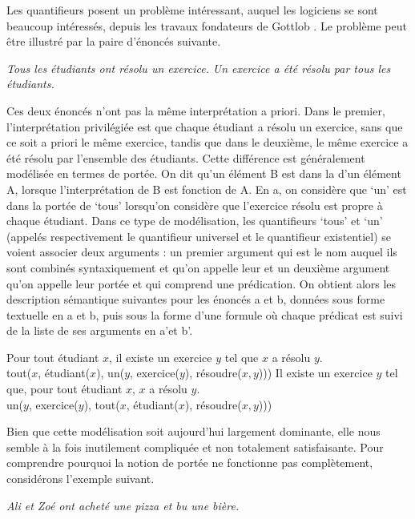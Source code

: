 {Les quantifieurs posent un problème intéressant, auquel les logiciens se sont beaucoup intéressés, depuis les travaux fondateurs de Gottlob \citet{frege1892uber}. Le problème peut être illustré par la paire d’énoncés suivante.

\ea\label{ex:13-portée}
\ea \textit{Tous les étudiants ont résolu un exercice.}
\ex \textit{Un exercice a été résolu par tous les étudiants.}\z\z

Ces deux énoncés n’ont pas la même interprétation a priori. Dans le premier, l’interprétation privilégiée est que chaque étudiant a résolu un exercice, sans que ce soit a priori le même exercice, tandis que dans le deuxième, le même exercice a été résolu par l’ensemble des étudiants. Cette différence est généralement modélisée en termes de portée. On dit qu’un élément B est dans la  d’un élément A, lorsque l’interprétation de B est fonction de A. En a, on considère que ‘un’ est dans la portée de ‘tous’ lorsqu’on considère que l’exercice résolu est propre à chaque étudiant. Dans ce type de modélisation, les quantifieurs ‘tous’ et ‘un’ (appelés respectivement le quantifieur universel et le quantifieur existentiel) se voient associer deux arguments : un premier argument qui est le nom auquel ils sont combinés syntaxiquement et qu’on appelle leur  et un deuxième argument qu’on appelle leur portée et qui comprend une prédication. On obtient alors les description sémantique suivantes pour les énoncés a et b, données sous forme textuelle en a et b, puis sous la forme d’une formule où chaque prédicat est suivi de la liste de ses arguments en a’et b’.

\ea\label{ex:13-scope}
\ea Pour tout étudiant $x$, il existe un exercice $y$ tel que $x$ a résolu $y$.\\
 tout($x$, étudiant($x$), un($y$, exercice($y$), résoudre($x,y$)))
\ex Il existe un exercice $y$ tel que, pour tout étudiant $x$, $x$ a résolu $y$.\\
un($y$, exercice($y$), tout($x$, étudiant($x$), résoudre($x,y$)))\z\z

Bien que cette modélisation soit aujourd’hui largement dominante, elle nous semble à la fois inutilement compliquée et non totalement satisfaisante. Pour comprendre pourquoi la notion de portée ne fonctionne pas complètement, considérons l’exemple suivant.

\ea\label{ex:13-pizza} \textit{Ali et Zoé ont acheté une pizza et bu une bière.}\z

}
